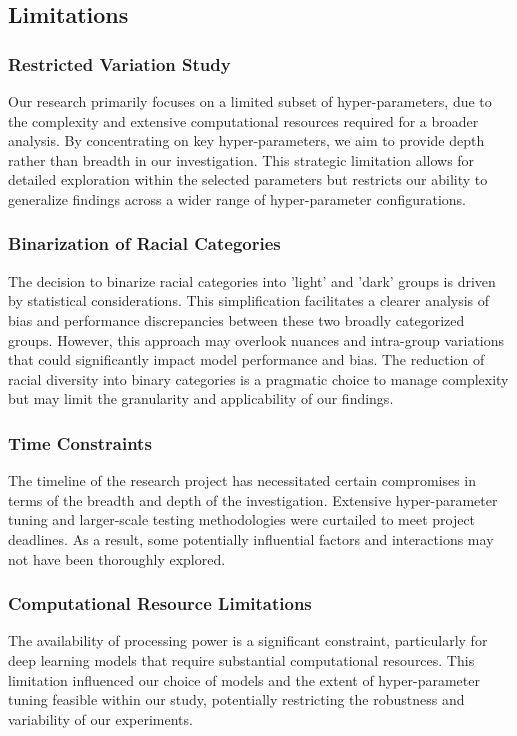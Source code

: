 \documentclass[conference]{IEEEtran}
\begin{document}
\subsection{Limitations}
\subsubsection{Restricted Variation Study}
Our research primarily focuses on a limited subset of hyper-parameters, due to the complexity and extensive computational resources required for a broader analysis. By concentrating on key hyper-parameters, we aim to provide depth rather than breadth in our investigation. This strategic limitation allows for detailed exploration within the selected parameters but restricts our ability to generalize findings across a wider range of hyper-parameter configurations.
\subsubsection{Binarization of Racial Categories}
The decision to binarize racial categories into 'light' and 'dark' groups is driven by statistical considerations. This simplification facilitates a clearer analysis of bias and performance discrepancies between these two broadly categorized groups. However, this approach may overlook nuances and intra-group variations that could significantly impact model performance and bias. The reduction of racial diversity into binary categories is a pragmatic choice to manage complexity but may limit the granularity and applicability of our findings.
\subsubsection{Time Constraints}
The timeline of the research project has necessitated certain compromises in terms of the breadth and depth of the investigation. Extensive hyper-parameter tuning and larger-scale testing methodologies were curtailed to meet project deadlines. As a result, some potentially influential factors and interactions may not have been thoroughly explored.
\subsubsection{Computational Resource Limitations}
The availability of processing power is a significant constraint, particularly for deep learning models that require substantial computational resources. This limitation influenced our choice of models and the extent of hyper-parameter tuning feasible within our study, potentially restricting the robustness and variability of our experiments.
\end{document}
